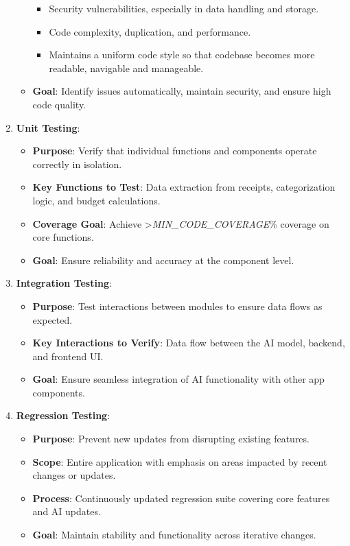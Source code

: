 \documentclass[12pt, titlepage]{article}
\begin{document}
\begin{enumerate}
\begin{itemize}
\begin{itemize}
			\item Security vulnerabilities, especially in data handling and storage.
			\item Code complexity, duplication, and performance.
			\item Maintains a uniform code style so that codebase becomes more readable, navigable and manageable.
		\end{itemize}
		\item \textbf{Goal}: Identify issues automatically, maintain security, and ensure high code quality.
	\end{itemize}
	\item \textbf{Unit Testing}:
	\begin{itemize}
		\item \textbf{Purpose}: Verify that individual functions and components operate correctly in isolation.
		\item \textbf{Key Functions to Test}: Data extraction from receipts, categorization logic, and budget calculations.
		\item \textbf{Coverage Goal}: Achieve >\textit{MIN\_CODE\_COVERAGE}\%
		coverage on core functions.
		\item \textbf{Goal}: Ensure reliability and accuracy at the component level.
	\end{itemize}
	\item \textbf{Integration Testing}:
	\begin{itemize}
		\item \textbf{Purpose}: Test interactions between modules to ensure data flows as expected.
		\item \textbf{Key Interactions to Verify}: Data flow between the AI model, backend, and frontend UI.
		\item \textbf{Goal}: Ensure seamless integration of AI functionality with other app components.
	\end{itemize}
	\item \textbf{Regression Testing}:
	\begin{itemize}
		\item \textbf{Purpose}: Prevent new updates from disrupting existing features.
		\item \textbf{Scope}: Entire application with emphasis on areas impacted by recent changes or updates.
		\item \textbf{Process}: Continuously updated regression suite covering core features and AI updates.
		\item \textbf{Goal}: Maintain stability and functionality across iterative changes.
	\end{itemize}
\end{enumerate}
\end{document}
